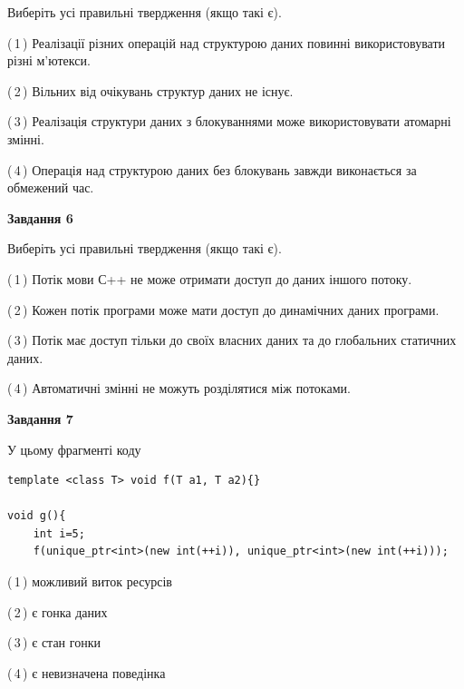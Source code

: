 \documentclass[12pt, ukrainian]{article}
\begin{document}
\begin {large}
{Виберіть усі правильні твердження (якщо такі є).\par
\vspace{2mm}

(\,1\,) Реалізації різних операцій над структурою даних повинні використовувати різні м’ютекси.%

(\,2\,) Вільних від очікувань структур даних не існує.%

(\,3\,) Реалізація структури даних з блокуваннями може використовувати атомарні змінні.%

(\,4\,) Операція над структурою даних без блокувань завжди виконається за обмежений час.%
\newpage


\begin{center}
\textbf{Завдання 6}
\end{center}

Виберіть усі правильні твердження (якщо такі є).\par
\vspace{2mm}

(\,1\,) Потік мови С++ не може отримати доступ до даних іншого потоку.%

(\,2\,) Кожен потік програми може мати доступ до динамічних даних програми.%

(\,3\,) Потік має доступ тільки до своїх власних даних та до глобальних статичних даних.%

(\,4\,) Автоматичні змінні не можуть розділятися між потоками.%


\begin{center}
\textbf{Завдання 7}
\end{center}

У цьому фрагменті коду
\begin{verbatim}
template <class T> void f(T a1, T a2){}

void g(){
    int i=5;
    f(unique_ptr<int>(new int(++i)), unique_ptr<int>(new int(++i)));
\end{verbatim}

(\,1\,) можливий виток ресурсів%

(\,2\,) є гонка даних%

(\,3\,) є стан гонки%

(\,4\,) є невизначена поведінка%

}
\end {large}

\vspace{4mm}
\newpage
\end{document}
